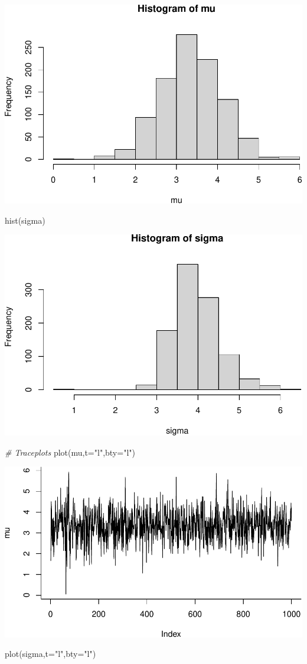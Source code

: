 \documentclass[
]{article}
\newenvironment{Shaded}{\begin{snugshade}}{\end{snugshade}}
\newcommand{\AttributeTok}[1]{\textcolor[rgb]{0.77,0.63,0.00}{#1}}
\newcommand{\CommentTok}[1]{\textcolor[rgb]{0.56,0.35,0.01}{\textit{#1}}}
\newcommand{\FunctionTok}[1]{\textcolor[rgb]{0.00,0.00,0.00}{#1}}
\newcommand{\NormalTok}[1]{#1}
\newcommand{\StringTok}[1]{\textcolor[rgb]{0.31,0.60,0.02}{#1}}
\begin{document}
\includegraphics[width=0.5\linewidth]{tutorial_files/figure-latex/unnamed-chunk-10-1}

\begin{Shaded}
\begin{Highlighting}[]
\FunctionTok{hist}\NormalTok{(sigma)}
\end{Highlighting}
\end{Shaded}

\includegraphics[width=0.5\linewidth]{tutorial_files/figure-latex/unnamed-chunk-10-2}

\begin{Shaded}
\begin{Highlighting}[]
\CommentTok{\# Traceplots}
\FunctionTok{plot}\NormalTok{(mu,}\AttributeTok{t=}\StringTok{"l"}\NormalTok{,}\AttributeTok{bty=}\StringTok{"l"}\NormalTok{)}
\end{Highlighting}
\end{Shaded}

\includegraphics[width=0.5\linewidth]{tutorial_files/figure-latex/unnamed-chunk-11-1}

\begin{Shaded}
\begin{Highlighting}[]
\FunctionTok{plot}\NormalTok{(sigma,}\AttributeTok{t=}\StringTok{"l"}\NormalTok{,}\AttributeTok{bty=}\StringTok{"l"}\NormalTok{)}
\end{Highlighting}
\end{Shaded}
\end{document}
